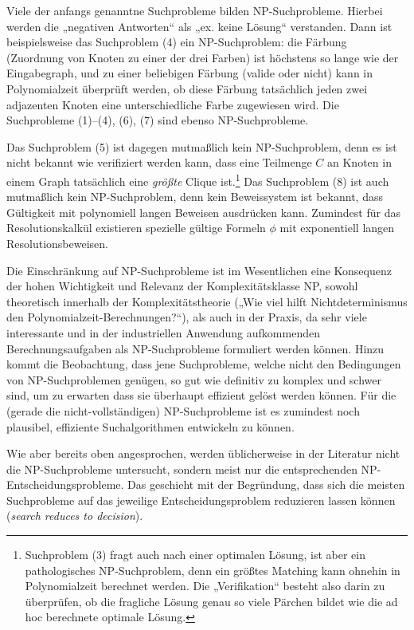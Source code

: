 Viele der anfangs genanntne Suchprobleme bilden NP-Suchprobleme. Hierbei werden die „negativen Antworten“ als „ex. keine Lösung“ verstanden. Dann ist beispielsweise das Suchproblem (4) ein NP-Suchproblem: die Färbung (Zuordnung von Knoten zu einer der drei Farben) ist höchstens so lange wie der Eingabegraph, und zu einer beliebigen Färbung (valide oder nicht) kann in Polynomialzeit überprüft werden, ob diese Färbung tatsächlich jeden zwei adjazenten Knoten eine unterschiedliche Farbe zugewiesen wird.
Die Suchprobleme (1)--(4), (6), (7) sind ebenso NP-Suchprobleme. 

Das Suchproblem (5) ist dagegen mutmaßlich kein NP-Suchproblem, denn es ist nicht bekannt wie verifiziert werden kann, dass eine Teilmenge $C$ an Knoten in einem Graph tatsächlich eine \emph{größte} Clique ist.\footnote{Suchproblem (3) fragt auch nach einer optimalen Lösung, ist aber ein pathologisches NP-Suchproblem, denn ein größtes Matching kann ohnehin in Polynomialzeit berechnet werden. Die „Verifikation“ besteht also darin zu überprüfen, ob die fragliche Lösung genau so viele Pärchen bildet wie die ad hoc berechnete optimale Lösung.}
Das Suchproblem (8) ist auch mutmaßlich kein NP-Suchproblem, denn kein Beweissystem ist bekannt, dass Gültigkeit mit polynomiell langen Beweisen ausdrücken kann. Zumindest für das Resolutionskalkül existieren spezielle gültige Formeln $\phi$ mit exponentiell langen Resolutionsbeweisen.

Die Einschränkung auf NP-Suchprobleme ist im Wesentlichen eine Konsequenz der hohen Wichtigkeit und Relevanz der Komplexitätsklasse NP, sowohl theoretisch innerhalb der Komplexitätstheorie („Wie viel hilft Nichtdeterminismus den Polynomialzeit-Berechnungen?“), als auch in der Praxis, da sehr viele interessante und in der industriellen Anwendung aufkommenden Berechnungsaufgaben als  NP-Suchprobleme formuliert werden können. Hinzu kommt die Beobachtung, dass jene Suchprobleme, welche nicht den Bedingungen von NP-Suchproblemen genügen, so gut wie definitiv zu komplex und schwer sind, um zu erwarten dass sie überhaupt effizient gelöst werden können. Für die (gerade die nicht-vollständigen) NP-Suchprobleme ist es zumindest noch plausibel, effiziente Suchalgorithmen entwickeln zu können.

Wie aber bereits oben angesprochen, werden üblicherweise in der Literatur nicht die NP-Suchprobleme untersucht, sondern meist nur die entsprechenden NP-Entscheidungsprobleme. Das geschieht mit der Begründung, dass sich die meisten Suchprobleme auf das jeweilige Entscheidungsproblem reduzieren lassen können (\emph{search reduces to decision}). 

